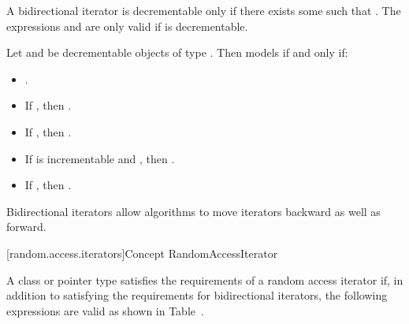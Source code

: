 
\begin{addedblock}
\pnum
A bidirectional iterator  is decrementable only if there exists some  such that
. The expressions  and  are only valid if  is
decrementable.

\pnum
Let  and  be decrementable objects of type . Then  models
 if and only if:

\begin{itemize}
\item {}.
\item If , then .
\item If , then .
\item If  is incrementable and , then
      .
\item If , then .
\end{itemize}
\end{addedblock}

\begin{removedblock}
\pnum
\enternote
Bidirectional iterators allow algorithms to move iterators backward as well as forward.
\exitnote
\end{removedblock}

[random.access.iterators]{Concept RandomAccessIterator}

\begin{removedblock}
\pnum
A class or pointer type
satisfies the requirements of a random access iterator if,
in addition to satisfying the requirements for bidirectional iterators,
the following expressions are valid as shown in Table~.
\end{removedblock}

